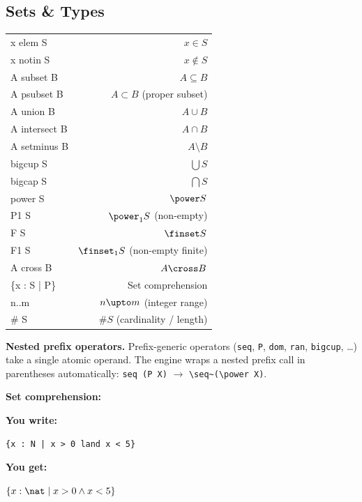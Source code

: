 \documentclass[10pt,landscape,a4paper]{article}
\newenvironment{exwrite}%
  {\par\nobreak\noindent\scriptsize\textbf{You write:}\par\nobreak\vspace{0pt}\scriptsize}%
  {\vspace{1pt}\nobreak}
\newenvironment{exget}%
  {\par\nobreak\noindent\scriptsize\textbf{You get:}\par\nobreak\vspace{0pt}\small}%
  {\par\vspace{3pt}}
\begin{document}
\newpage
\begin{multicols}{2}
\raggedcolumns

\section{Sets \& Types}

\begin{tabularx}{\columnwidth}{LR}
x elem S             & $x \in S$ \\
x notin S            & $x \notin S$ \\
A subset B           & $A \subseteq B$ \\
A psubset B          & $A \subset B$ (proper subset) \\
A union B            & $A \cup B$ \\
A intersect B        & $A \cap B$ \\
A setminus B         & $A \setminus B$ \\
bigcup S             & $\bigcup S$ \\
bigcap S             & $\bigcap S$ \\
power S              & $\power S$ \\
P1 S                 & $\power_1 S$ (non-empty) \\
F S                  & $\finset S$ \\
F1 S                 & $\finset_1 S$ (non-empty finite) \\
A cross B            & $A \cross B$ \\
\{x : S | P\}        & Set comprehension \\
n..m                 & $n \upto m$ (integer range) \\
\# S                 & $\# S$ (cardinality / length) \\
\end{tabularx}

{\footnotesize\textbf{Nested prefix operators.} Prefix-generic operators (\texttt{seq}, \texttt{P}, \texttt{dom}, \texttt{ran}, \texttt{bigcup}, …) take a single atomic operand. The engine wraps a nested prefix call in parentheses automatically: \texttt{seq (P X)} $\to$ \verb|\seq~(\power X)|.}

\smallskip
{}
\textbf{Set comprehension:}

\begin{exwrite}%
\begin{verbatim}
{x : N | x > 0 land x < 5}
\end{verbatim}
\end{exwrite}
\begin{exget}%
\begin{center}
$\{x : \nat \mid x > 0 \land x < 5\}$
\end{center}
\end{exget}


\end{multicols}
\end{document}
